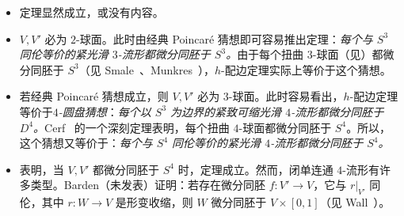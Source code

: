 \begin{itemize}
  \item[$n=0,1,2$：]定理显然成立，或没有内容。

  \item[$n=3$：]$V,V'$ 必为 $2$-球面。此时由经典 Poincaré 猜想即可容易推出定理：\emph{每个与 $S^3$ 同伦等价的紧光滑 $3$-流形都微分同胚于 $S^3$。}由于每个扭曲 $3$-球面（见）都微分同胚于 $S^3$（见 Smale~\cite{ref30}、Munkres~\cite{ref31}），$h$-配边定理实际上等价于这个猜想。

  \item[$n=4$：]若经典 Poincaré 猜想成立，则 $V,V'$ 必为 $3$-球面。此时容易看出，$h$-配边定理等价于\emph{$4$-圆盘猜想}：\emph{每个以 $S^3$ 为边界的紧致可缩光滑 $4$-流形都微分同胚于 $D^4$。}Cerf~\cite{ref29} 的一个深刻定理表明，每个扭曲 $4$-球面都微分同胚于 $S^4$。所以，这个猜想又等价于：\emph{每个与 $S^4$ 同伦等价的紧光滑 $4$-流形都微分同胚于 $S^4$。}

  \item[$n=5$：] 表明，当 $V,V'$ 都微分同胚于 $S^4$ 时，定理成立。然而，闭单连通 $4$-流形有许多类型。Barden（未发表）证明：若存在微分同胚 $f:V'\to V$，它与 $r|_{V'}$ 同伦，其中 $r:W\to V$ 是形变收缩，则 $W$ 微分同胚于 $V\times[0,1]$（见 Wall~\cite{ref38,ref37}）。
\end{itemize}
